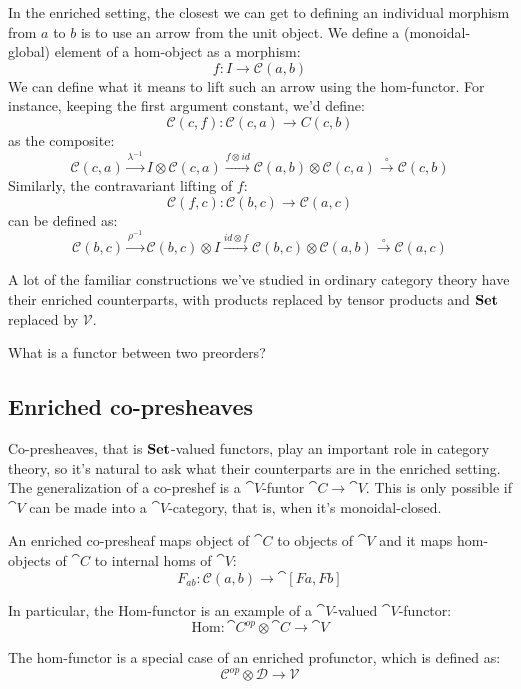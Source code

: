\documentclass[DaoFP]{subfiles}
\begin{document}
In the enriched setting, the closest we can get to defining an individual morphism from $a$ to $b$ is to use an arrow from the unit object. We define a (monoidal-global) element of a hom-object as a morphism:
\[ f \colon I \to \mathcal C(a, b) \]
We can define what it means to lift such an arrow using the hom-functor. For instance, keeping the first argument constant, we'd define:
\[ \mathcal C(c, f) \colon \mathcal C(c, a) \to C(c, b) \] 
as the composite:
\[ \mathcal C(c, a) \xrightarrow{\lambda^{-1}} I \otimes \mathcal C(c, a) \xrightarrow{f \otimes id} \mathcal C(a, b) \otimes \mathcal C(c, a) \xrightarrow{\circ} \mathcal C(c, b) \]
Similarly, the contravariant lifting of $f$:
\[ \mathcal C(f, c) \colon \mathcal C(b, c) \to \mathcal C(a, c) \]
can be defined as:
\[ \mathcal C(b, c) \xrightarrow{\rho^{-1}} \mathcal C(b, c) \otimes I \xrightarrow{id \otimes f} \mathcal C (b, c) \otimes \mathcal C(a, b) \xrightarrow{\circ} \mathcal C(a, c) \]

A lot of the familiar constructions we've studied in ordinary category theory have their enriched counterparts, with products replaced by tensor products and $\mathbf{Set}$ replaced by $\mathcal V$.

\begin{exercise}
What is a functor between two preorders?
\end{exercise}

\subsection{Enriched co-presheaves}
Co-presheaves, that is $\mathbf{Set}$-valued functors, play an important role in category theory, so it's natural to ask what their counterparts are in the enriched setting. The generalization of a co-preshef is a $\cat V$-funtor $\cat C \to \cat V$. This is only possible if $\cat V$ can be made into a $\cat V$-category, that is, when it's monoidal-closed. 

An enriched co-presheaf maps object of $\cat C$ to objects of $\cat V$ and it maps hom-objects of $\cat C$ to internal homs of $\cat V$:
\[ F_{a b} \colon \mathcal C (a, b) \to \cat [F a, F b] \]

In particular, the $\text{Hom}$-functor is an example of a $\cat V$-valued $\cat V$-functor:
\[ \text{Hom} \colon \cat C^{op} \otimes \cat C \to \cat V \]

The hom-functor is a special case of an enriched profunctor, which is defined as:
\[ \mathcal C^{op} \otimes \mathcal D \to \mathcal V \]
\end{document}
